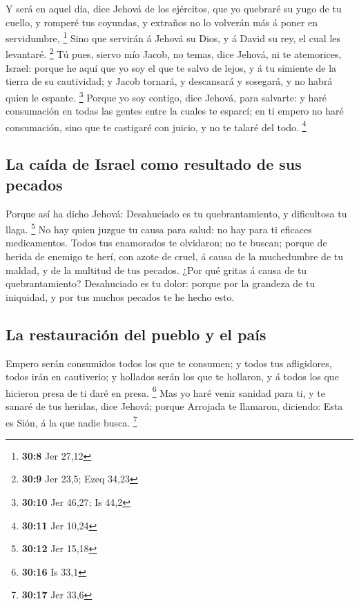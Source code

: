  Y será en aquel día, dice Jehová de los ejércitos, que yo
quebraré su yugo de tu cuello, y romperé tus coyundas, y extraños no lo
volverán más á poner en servidumbre, \footnote{\textbf{30:8} Jer 27,12}
 Sino que servirán á Jehová su Dios, y á David su rey, el
cual les levantaré. \footnote{\textbf{30:9} Jer 23,5; Ezeq 34,23}
 Tú pues, siervo mío Jacob, no temas, dice Jehová, ni te
atemorices, Israel: porque he aquí que yo soy el que te salvo de lejos,
y á tu simiente de la tierra de su cautividad; y Jacob tornará, y
descansará y sosegará, y no habrá quien le espante. \footnote{\textbf{30:10}
  Jer 46,27; Is 44,2}  Porque yo soy contigo, dice Jehová,
para salvarte: y haré consumación en todas las gentes entre la cuales te
esparcí; en ti empero no haré consumación, sino que te castigaré con
juicio, y no te talaré del todo. \footnote{\textbf{30:11} Jer 10,24}

\hypertarget{la-cauxedda-de-israel-como-resultado-de-sus-pecados}{%
\subsection{La caída de Israel como resultado de sus
pecados}\label{la-cauxedda-de-israel-como-resultado-de-sus-pecados}}

 Porque así ha dicho Jehová: Desahuciado es tu
quebrantamiento, y dificultosa tu llaga. \footnote{\textbf{30:12} Jer
  15,18}  No hay quien juzgue tu causa para salud: no hay
para ti eficaces medicamentos.  Todos tus enamorados te
olvidaron; no te buscan; porque de herida de enemigo te herí, con azote
de cruel, á causa de la muchedumbre de tu maldad, y de la multitud de
tus pecados.  ¿Por qué gritas á causa de tu
quebrantamiento? Desahuciado es tu dolor: porque por la grandeza de tu
iniquidad, y por tus muchos pecados te he hecho esto.

\hypertarget{la-restauraciuxf3n-del-pueblo-y-el-pauxeds}{%
\subsection{La restauración del pueblo y el
país}\label{la-restauraciuxf3n-del-pueblo-y-el-pauxeds}}

 Empero serán consumidos todos los que te consumen; y todos
tus afligidores, todos irán en cautiverio; y hollados serán los que te
hollaron, y á todos los que hicieron presa de ti daré en presa.
\footnote{\textbf{30:16} Is 33,1}  Mas yo haré venir
sanidad para ti, y te sanaré de tus heridas, dice Jehová; porque
Arrojada te llamaron, diciendo: Esta es Sión, á la que nadie busca.
\footnote{\textbf{30:17} Jer 33,6}

